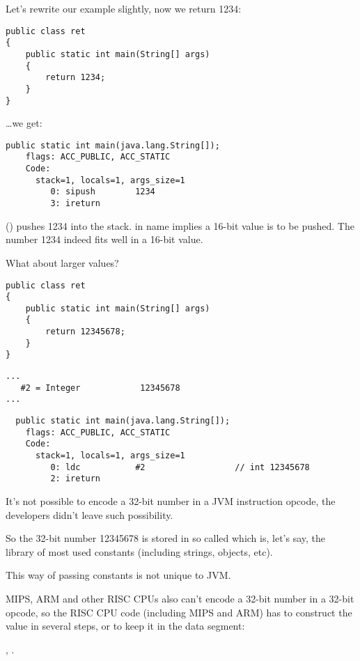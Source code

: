 Let's rewrite our example slightly, now we return 1234:

\begin{lstlisting}
public class ret
{
	public static int main(String[] args)
	{
		return 1234;
	}
}
\end{lstlisting}

\dots we get:

\begin{lstlisting}[caption=JDK 1.7 (excerpt)]
  public static int main(java.lang.String[]);
    flags: ACC_PUBLIC, ACC_STATIC
    Code:
      stack=1, locals=1, args_size=1
         0: sipush        1234
         3: ireturn       
\end{lstlisting}

 () pushes 1234 into the stack.
 in name implies a 16-bit value is to be pushed. 
The number 1234 indeed fits well in a 16-bit value.

What about larger values?

\begin{lstlisting}
public class ret
{
	public static int main(String[] args) 
	{
		return 12345678;
	}
}
\end{lstlisting}

\begin{lstlisting}[caption=Constant pool]
...
   #2 = Integer            12345678
...
\end{lstlisting}

\begin{lstlisting}
  public static int main(java.lang.String[]);
    flags: ACC_PUBLIC, ACC_STATIC
    Code:
      stack=1, locals=1, args_size=1
         0: ldc           #2                  // int 12345678
         2: ireturn       
\end{lstlisting}

It's not possible to encode a 32-bit number in a JVM instruction opcode, 
the developers didn't leave such possibility.

So the 32-bit number 12345678 is stored in so called  which is, let's say,
the library of most used constants (including strings, objects, etc).

This way of passing constants is not unique to JVM.

MIPS, ARM and other RISC CPUs also can't encode a 32-bit number
in a 32-bit opcode, so the RISC CPU code (including MIPS and ARM) has to construct the value 
in several steps, or to keep it in the data segment:

, .

